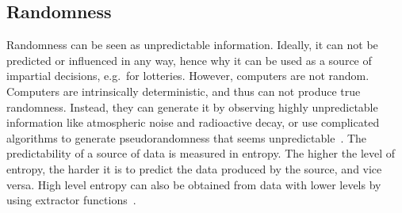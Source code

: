 \subsection{Randomness}


Randomness can be seen as unpredictable information. Ideally, it can not be predicted or influenced in any way, hence why it can be used as a source of impartial decisions, e.g.\ for lotteries.
However, computers are not random. Computers are intrinsically deterministic, and thus can not produce true randomness. Instead, they can generate it by observing highly unpredictable information like atmospheric noise and radioactive decay, or use complicated algorithms to generate pseudorandomness that seems unpredictable~\cite{randomsources}.
The predictability of a source of data is measured in entropy. The higher the level of entropy, the harder it is to predict the data produced by the source, and vice versa. High level entropy can also be obtained from data with lower levels by using extractor functions~\cite{pseudorandomness}.
